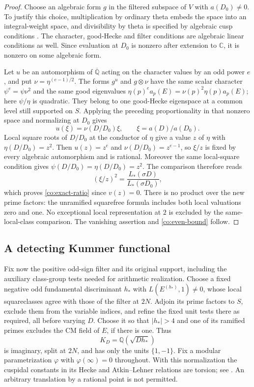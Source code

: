 \begin{proof}
Choose an algebraic form $g$ in the filtered subspace of $V$ with
$a(D_0)\ne0$.  To justify this choice, multiplication by ordinary theta
embeds the space into an integral-weight space, and divisibility by
theta is specified by algebraic cusp conditions
\cite[\S\S3--4]{Ramsey2006HalfIntegral}.  The character, good-Hecke
and filter conditions are algebraic linear conditions as well.
Since evaluation at $D_0$ is nonzero after extension to $\mathbb C$,
it is nonzero on some algebraic form.

Let $u$ be an automorphism of $\overline{\mathbb Q}$ acting on the
character values by an odd power $e$, and put $\nu=\eta^{(e-1)/2}$.
The forms $g^u$ and $g\otimes\nu$ have the same scalar character
$\psi^e=\psi\nu^2$ and the same good eigenvalues
$\eta(p)^e a_p(E)=\nu(p)^2\eta(p)a_p(E)$; here $\psi/\eta$ is
quadratic.  They belong to one good-Hecke eigenspace at a common level
still supported on $S$.  Applying the preceding proportionality in
that nonzero space and normalizing at $D_0$ gives
\[
 u(\xi)=\nu(D/D_0)\xi,\qquad \xi=a(D)/a(D_0).
\]
Local square roots of $D/D_0$ at the conductor of $\eta$ give a value
$z$ of $\eta$ with $\eta(D/D_0)=z^2$.  Then $u(z)=z^e$ and
$\nu(D/D_0)=z^{e-1}$, so $\xi/z$ is fixed by every algebraic
automorphism and is rational.  Moreover the same local-square condition
gives $\psi(D/D_0)=\eta(D/D_0)=z^2$.  The comparison therefore reads
\[
 (\xi/z)^2=\frac{L_*(\sigma D)}{L_*(\sigma D_0)},
\]
which proves \eqref{co:exact-ratio} since $v(z)=0$.
There is no product over the new prime factors: the unramified
squarefree formula includes both local valuations zero and one.
No exceptional local representation at $2$ is excluded by the
same-local-class comparison.  The vanishing assertion and
\eqref{co:even-bound} follow.
\end{proof}

\subsection{A detecting Kummer functional}

Fix now the positive odd-sign filter and its original support, including
the auxiliary class-group tests needed for arithmetic realization.
Choose a fixed negative odd
fundamental discriminant $h_*$ with $L(E^{(h_*)},1)\neq0$, whose local
squareclasses agree with those of the filter at $2N$.  Adjoin its prime
factors to $S$, exclude them from the variable indices, and refine the
fixed unit tests there as required, all before varying $D$.
Choose it so that $|h_*|>4$ and one of its ramified primes
excludes the CM field of $E$, if there is one.  Thus
\[
 K_D=\mathbb Q(\sqrt{Dh_*})
\]
is imaginary, split at $2N$, and has only the units $\{1,-1\}$.
Fix a modular parametrization $\varphi$
with $\varphi(\infty)=0$ throughout.  With this normalization the
cuspidal constants in its Hecke and Atkin--Lehner relations are torsion;
see \cite{Manin1972,Drinfeld1973}.  An arbitrary translation by a
rational point is not permitted.

